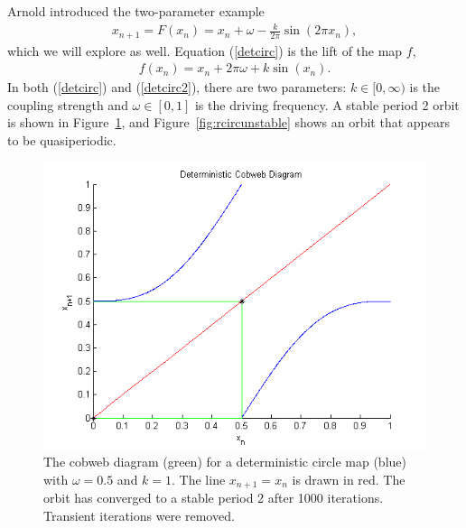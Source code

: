 Arnold introduced the two-parameter example
\begin{align}\label{detcirc}
x_{n+1}= F(x_n) =  x_n + \omega - \frac{k}{2\pi}\sin(2\pi x_n),
\end{align}
which we will explore as well. Equation (\ref{detcirc}) is the lift of the map
$f$,
\begin{align}\label{detcirc2}
f(x_n) = x_n + 2\pi \omega + k\sin(x_n).
\end{align}
In both (\ref{detcirc}) and (\ref{detcirc2}), there are two parameters: $k \in [0,\infty)$
is the coupling strength and $\omega \in [0,1]$ is the driving
frequency. A stable period 2 orbit is shown in
Figure~\ref{fig:dcircstable}, and
Figure~\ref{fig:rcircunstable} shows an orbit that appears to be quasiperiodic.
\begin{figure}[!h]
\caption[Deterministic circle map, stable orbit]{The cobweb
  diagram (green) for a deterministic circle map (blue) with $\omega =
  0.5$ and $k=1$. The line $x_{n+1}=x_n$ is drawn in red. The orbit
  has converged to a stable period 2 after 1000 iterations. Transient iterations were removed.}\label{fig:dcircstable}
	\begin{center}
		\includegraphics[scale=0.7]{figs/detcirc_cobweb_2.png}
	\end{center}
\end{figure}
